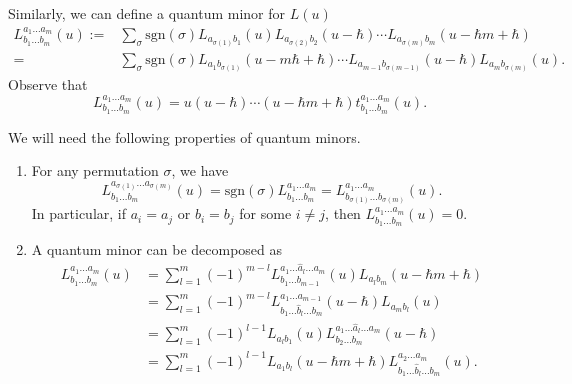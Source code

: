 	Similarly, we can define a quantum minor for $L(u)$
	\begin{align}
			L_{b_1\dots b_m}^{a_1\dots a_m}(u) :={} & \sum\limits_{\sigma} \mathrm{sgn}(\sigma) L_{a_{\sigma(1)}b_1} (u) L_{a_{\sigma(2)} b_2} (u-\hbar) \cdots L_{a_{\sigma(m)} b_m} (u-\hbar m + \hbar)\nonumber \\
			={} & \sum\limits_{\sigma} \mathrm{sgn}(\sigma) L_{a_1 b_{\sigma(1)}}(u-m\hbar+\hbar)\cdots L_{a_{m-1} b_{\sigma(m-1)}} (u-\hbar) L_{a_m b_{\sigma(m)}}(u).		\label{eq::quantum_minor}
	\end{align}
	Observe that
	\begin{equation}
		\label{eq::t_l_minor_relation}
		L_{b_1\dots b_m}^{a_1\dots a_m}(u) = u(u-\hbar)\cdots (u-\hbar m + \hbar)t_{b_1\dots b_m}^{a_1\dots a_m}(u).
	\end{equation}
	
	We will need the following properties of quantum minors.
	\begin{Proposition}\qquad
		\label{prop::minor_basic}
		\begin{enumerate}\itemsep=0pt
			\item[$(1)$]\label{prop::minor_basic_perm} For any permutation $\sigma$, we have
			\[
			L_{b_1\dots b_m}^{a_{\sigma(1)}\dots a_{\sigma(m)}}(u) = \mathrm{sgn}(\sigma) L_{b_1\dots b_m}^{a_1 \dots a_m} = L_{b_{\sigma(1)} \dots b_{\sigma(m)}}^{a_1\dots a_m}(u).
			\]
			In particular, if $a_i = a_j$ or $b_i=b_j$ for some $i\neq j$, then $L_{b_1\dots b_m}^{a_1 \dots a_m} (u) = 0$.
			\item[$(2)$]\label{prop::minor_basic_sum} A quantum minor can be decomposed as {\rm\cite[\emph{Proposition} 1.6.8]{MolevYangians}}
			\begin{align*}
				L_{b_1 \dots b_m}^{a_1 \dots a_m}(u)& =\sum\limits_{l=1}^m (-1)^{m-l} L_{b_1 \dots b_{m-1}}^{a_1 \dots \hat{a}_l \dots a_m}(u) L_{a_l b_m}(u-\hbar m + \hbar) \\
				&= \sum\limits_{l=1}^m (-1)^{m-l} L_{b_1\dots \hat{b}_l \dots b_m}^{a_1\dots a_{m-1}}(u-\hbar) L_{a_m b_l}(u) \\
				&= \sum\limits_{l=1}^m (-1)^{l-1} L_{a_l b_1} (u) L_{b_2\dots b_m}^{a_1 \dots \hat{a}_l \dots a_m} (u-\hbar) \\
				&= \sum\limits_{l=1}^m (-1)^{l-1} L_{a_1 b_l}(u-\hbar m + \hbar) L_{b_1 \dots \hat{b}_l \dots b_m}^{a_2 \dots a_m}(u).
			\end{align*}
		\end{enumerate}
	\end{Proposition}
	
